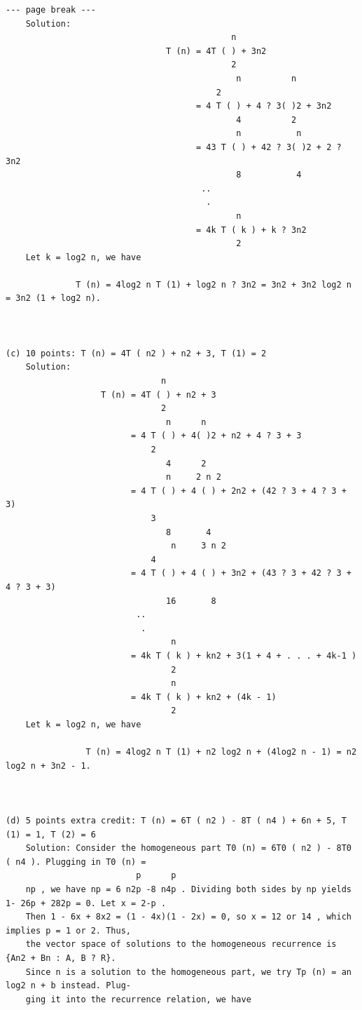 \documentclass[12pt]{article}
\begin{document}
\begin{Verbatim}[breaklines=true,fontsize=\small]
--- page break ---
    Solution:
                                             n
                                T (n) = 4T ( ) + 3n2
                                             2
                                              n          n
                                          2
                                      = 4 T ( ) + 4 ? 3( )2 + 3n2
                                              4          2
                                              n           n
                                      = 43 T ( ) + 42 ? 3( )2 + 2 ? 3n2
                                              8           4
                                       ..
                                        .
                                              n
                                      = 4k T ( k ) + k ? 3n2
                                              2
    Let k = log2 n, we have

              T (n) = 4log2 n T (1) + log2 n ? 3n2 = 3n2 + 3n2 log2 n = 3n2 (1 + log2 n).



(c) 10 points: T (n) = 4T ( n2 ) + n2 + 3, T (1) = 2
    Solution:
                               n
                   T (n) = 4T ( ) + n2 + 3
                               2
                                n      n
                         = 4 T ( ) + 4( )2 + n2 + 4 ? 3 + 3
                             2
                                4      2
                                n     2 n 2
                         = 4 T ( ) + 4 ( ) + 2n2 + (42 ? 3 + 4 ? 3 + 3)
                             3
                                8       4
                                 n     3 n 2
                             4
                         = 4 T ( ) + 4 ( ) + 3n2 + (43 ? 3 + 42 ? 3 + 4 ? 3 + 3)
                                16       8
                          ..
                           .
                                 n
                         = 4k T ( k ) + kn2 + 3(1 + 4 + . . . + 4k-1 )
                                 2
                                 n
                         = 4k T ( k ) + kn2 + (4k - 1)
                                 2
    Let k = log2 n, we have

                T (n) = 4log2 n T (1) + n2 log2 n + (4log2 n - 1) = n2 log2 n + 3n2 - 1.



(d) 5 points extra credit: T (n) = 6T ( n2 ) - 8T ( n4 ) + 6n + 5, T (1) = 1, T (2) = 6
    Solution: Consider the homogeneous part T0 (n) = 6T0 ( n2 ) - 8T0 ( n4 ). Plugging in T0 (n) =
                          p      p
    np , we have np = 6 n2p -8 n4p . Dividing both sides by np yields 1- 26p + 282p = 0. Let x = 2-p .
    Then 1 - 6x + 8x2 = (1 - 4x)(1 - 2x) = 0, so x = 12 or 14 , which implies p = 1 or 2. Thus,
    the vector space of solutions to the homogeneous recurrence is {An2 + Bn : A, B ? R}.
    Since n is a solution to the homogeneous part, we try Tp (n) = an log2 n + b instead. Plug-
    ging it into the recurrence relation, we have



\end{Verbatim}
\end{document}
